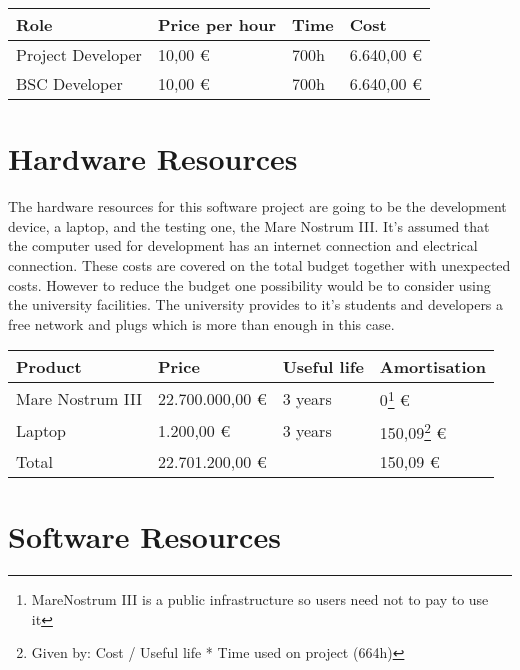 \begin{center}
	\begin{tabular}{| R{3cm} | L{3cm} | L{3cm} | L{3cm} |}
	\hline
	Role & Price per hour & Time & Cost \\ 
	\hline
	\hline
	Project Developer & 10,00 \euro & 700h & 6.640,00 \euro \\
	\hline
	BSC Developer & 10,00 \euro & 700h & 6.640,00 \euro \\
	\hline
	\end{tabular}
\end{center}


\section{Hardware Resources}
\label{sec:hardware_resources}
The hardware resources for this software project are going to be the development device, a laptop, and the testing one, the Mare Nostrum III. It's assumed that the computer used for development has an internet connection and electrical connection. These costs are covered on the total budget together with unexpected costs. However to reduce the budget one possibility would be to consider using the university facilities. The university provides to it's students and developers a free network and plugs which is more than enough in this case.


\begin{center}
	\begin{tabular}{| R{4cm} | L{3cm} | L{2cm} | L{3cm} |}
	\hline
	Product & Price & Useful life & Amortisation \\ 
	\hline \hline
	Mare Nostrum III & 22.700.000,00 \euro & 3 years & 0\protect\footnote{ MareNostrum III is a public infrastructure so users need not to pay to use it} \euro \\
	\hline
	Laptop & 1.200,00 \euro & 3 years & 150,09\footnote{ Given by: Cost / Useful life * Time used on project (664h)} \euro \\
	\hline
	\hline
	Total & 22.701.200,00 \euro & & 150,09 \euro \\
	\hline
	\end{tabular}
\end{center}


\section{Software Resources}
\label{sec:software_resources}

